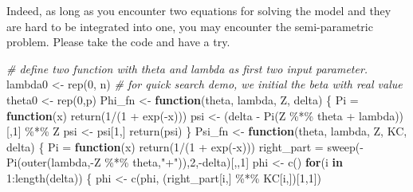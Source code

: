 \documentclass[
]{article}
\newenvironment{Shaded}{\begin{snugshade}}{\end{snugshade}}
\newcommand{\CommentTok}[1]{\textcolor[rgb]{0.56,0.35,0.01}{\textit{#1}}}
\newcommand{\ControlFlowTok}[1]{\textcolor[rgb]{0.13,0.29,0.53}{\textbf{#1}}}
\newcommand{\DecValTok}[1]{\textcolor[rgb]{0.00,0.00,0.81}{#1}}
\newcommand{\FunctionTok}[1]{\textcolor[rgb]{0.00,0.00,0.00}{#1}}
\newcommand{\NormalTok}[1]{#1}
\newcommand{\OtherTok}[1]{\textcolor[rgb]{0.56,0.35,0.01}{#1}}
\newcommand{\SpecialCharTok}[1]{\textcolor[rgb]{0.00,0.00,0.00}{#1}}
\newcommand{\StringTok}[1]{\textcolor[rgb]{0.31,0.60,0.02}{#1}}
\begin{document}
Indeed, as long as you encounter two equations for solving the model and
they are hard to be integrated into one, you may encounter the
semi-parametric problem. Please take the code and have a try.

\begin{Shaded}
\begin{Highlighting}[]
\CommentTok{\# define two function with theta and lambda as first two input parameter.}
\NormalTok{lambda0 }\OtherTok{\textless{}{-}} \FunctionTok{rep}\NormalTok{(}\DecValTok{0}\NormalTok{, n)}
\CommentTok{\# for quick search demo, we initial the beta with real value}
\NormalTok{theta0 }\OtherTok{\textless{}{-}} \FunctionTok{rep}\NormalTok{(}\DecValTok{0}\NormalTok{,p)}
\NormalTok{Phi\_fn }\OtherTok{\textless{}{-}} \ControlFlowTok{function}\NormalTok{(theta, lambda, Z, delta) \{}
\NormalTok{  Pi }\OtherTok{=} \ControlFlowTok{function}\NormalTok{(x) }\FunctionTok{return}\NormalTok{(}\DecValTok{1}\SpecialCharTok{/}\NormalTok{(}\DecValTok{1} \SpecialCharTok{+} \FunctionTok{exp}\NormalTok{(}\SpecialCharTok{{-}}\NormalTok{x)))}
\NormalTok{  psi }\OtherTok{\textless{}{-}}\NormalTok{ (delta }\SpecialCharTok{{-}} \FunctionTok{Pi}\NormalTok{(Z }\SpecialCharTok{\%*\%}\NormalTok{ theta }\SpecialCharTok{+}\NormalTok{ lambda))[,}\DecValTok{1}\NormalTok{] }\SpecialCharTok{\%*\%}\NormalTok{ Z}
\NormalTok{  psi }\OtherTok{\textless{}{-}}\NormalTok{ psi[}\DecValTok{1}\NormalTok{,]}
  \FunctionTok{return}\NormalTok{(psi)}
\NormalTok{\}}
\NormalTok{Psi\_fn }\OtherTok{\textless{}{-}} \ControlFlowTok{function}\NormalTok{(theta, lambda, Z, KC, delta) \{}
\NormalTok{  Pi }\OtherTok{=} \ControlFlowTok{function}\NormalTok{(x) }\FunctionTok{return}\NormalTok{(}\DecValTok{1}\SpecialCharTok{/}\NormalTok{(}\DecValTok{1} \SpecialCharTok{+} \FunctionTok{exp}\NormalTok{(}\SpecialCharTok{{-}}\NormalTok{x)))}
\NormalTok{  right\_part }\OtherTok{=} \FunctionTok{sweep}\NormalTok{(}\SpecialCharTok{{-}}\FunctionTok{Pi}\NormalTok{(}\FunctionTok{outer}\NormalTok{(lambda,}\SpecialCharTok{{-}}\NormalTok{Z }\SpecialCharTok{\%*\%}\NormalTok{ theta,}\StringTok{"+"}\NormalTok{)),}\DecValTok{2}\NormalTok{,}\SpecialCharTok{{-}}\NormalTok{delta)[,,}\DecValTok{1}\NormalTok{]}
\NormalTok{  phi }\OtherTok{\textless{}{-}} \FunctionTok{c}\NormalTok{()}
  \ControlFlowTok{for}\NormalTok{(i }\ControlFlowTok{in} \DecValTok{1}\SpecialCharTok{:}\FunctionTok{length}\NormalTok{(delta)) \{}
\NormalTok{    phi }\OtherTok{\textless{}{-}} \FunctionTok{c}\NormalTok{(phi, (right\_part[i,] }\SpecialCharTok{\%*\%}\NormalTok{ KC[i,])[}\DecValTok{1}\NormalTok{,}\DecValTok{1}\NormalTok{])}

\end{Highlighting}
\end{Shaded}
\end{document}
